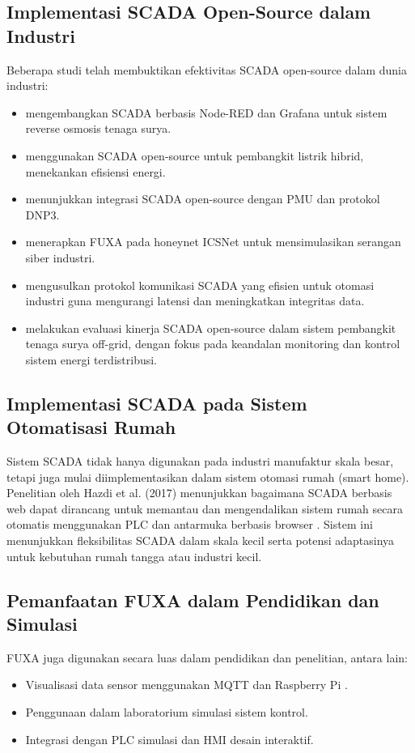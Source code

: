 \subsection{Implementasi SCADA Open-Source dalam Industri}
Beberapa studi telah membuktikan efektivitas SCADA open-source dalam dunia industri:


\begin{itemize}
\item \textcite{uddin2022open} mengembangkan SCADA berbasis Node-RED dan Grafana untuk sistem reverse osmosis tenaga surya.
\item \textcite{omidi2023node} menggunakan SCADA open-source untuk pembangkit listrik hibrid, menekankan efisiensi energi.
\item \textcite{almas2014open} menunjukkan integrasi SCADA open-source dengan PMU dan protokol DNP3.
\item \textcite{rubiomedrano2023icsnet} menerapkan FUXA pada honeynet ICSNet untuk mensimulasikan serangan siber industri.
\item \textcite{abbas2015efficient} mengusulkan protokol komunikasi SCADA yang efisien untuk otomasi industri guna mengurangi latensi dan meningkatkan integritas data.
\item \textcite{eras_almeida2023off_grid_pv} melakukan evaluasi kinerja SCADA open-source dalam sistem pembangkit tenaga surya off-grid, dengan fokus pada keandalan monitoring dan kontrol sistem energi terdistribusi.
\end{itemize}
\subsection{Implementasi SCADA pada Sistem Otomatisasi Rumah}
Sistem SCADA tidak hanya digunakan pada industri manufaktur skala besar, tetapi juga mulai diimplementasikan dalam sistem otomasi rumah (smart home). Penelitian oleh Hazdi et al. (2017) menunjukkan bagaimana SCADA berbasis web dapat dirancang untuk memantau dan mengendalikan sistem rumah secara otomatis menggunakan PLC dan antarmuka berbasis browser \parencite{hazdi2017scada}. Sistem ini menunjukkan fleksibilitas SCADA dalam skala kecil serta potensi adaptasinya untuk kebutuhan rumah tangga atau industri kecil.

\subsection{Pemanfaatan FUXA dalam Pendidikan dan Simulasi}
FUXA juga digunakan secara luas dalam pendidikan dan penelitian, antara lain:

\begin{itemize}
    \item Visualisasi data sensor menggunakan MQTT dan Raspberry Pi \parencite{seeed2024fuxa}.
    \item Penggunaan dalam laboratorium simulasi sistem kontrol.
    \item Integrasi dengan PLC simulasi dan HMI desain interaktif.
\end{itemize}
